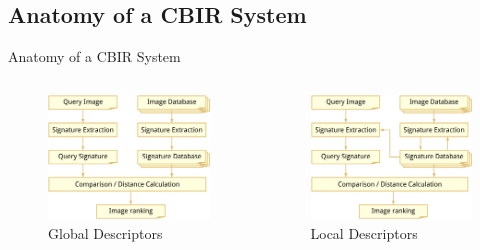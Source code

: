 \documentclass[mathserif]{beamer}
\begin{document}
\subsection{Anatomy of a CBIR System}
\begin{frame}{Anatomy of a CBIR System}
    \begin{columns}
        \begin{column}{0.5\textwidth}
            \begin{figure}
                \includegraphics[width=.9\textwidth]{illustrations/cbir_anatomy_query_cropped}
                \caption{Global Descriptors}
                \label{fig:anatomy_global}
            \end{figure}
        \end{column}
        \begin{column}{0.5\textwidth}
            \begin{figure}
                \includegraphics[width=.9\textwidth]{illustrations/cbir_anatomy_query_local_cropped}
                \caption{Local Descriptors}
                \label{fig:anatomy_local}
            \end{figure}
        \end{column}
    \end{columns}
\end{frame}
\end{document}
